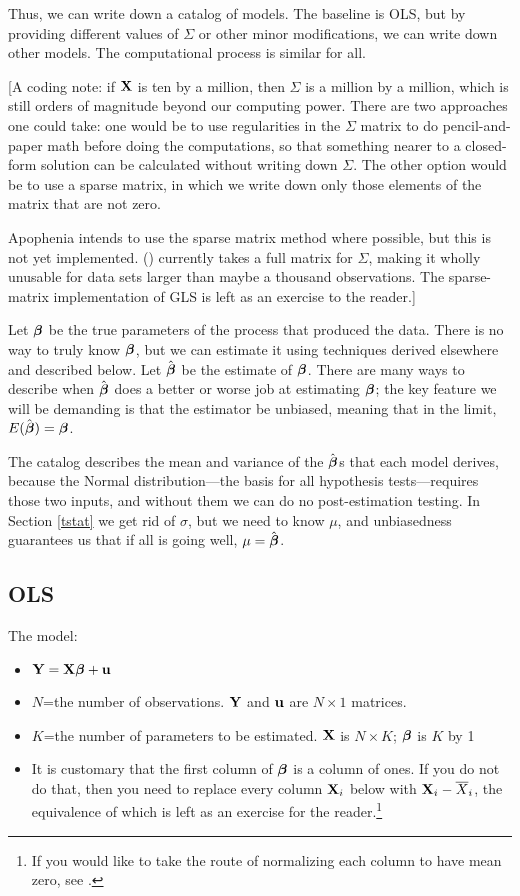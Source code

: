Thus, we can write down a catalog of models. The baseline is OLS, but by
providing different values of $\Sigma$ or other minor modifications, we
can write down other models. The computational process is similar
for all.

[A coding note: if ${\bf X}$ is ten by a million, then $\Sigma$ is a million
by a million, which is still orders of magnitude beyond our computing
power. There are two approaches one could take: one would be to use
regularities in the $\Sigma$ matrix to do pencil-and-paper math before
doing the computations, so that something nearer to a closed-form
solution can be calculated without writing down $\Sigma$. The other
option would be to use a sparse matrix, in which
we write down only those elements of the matrix that are not zero. 

Apophenia intends to use the sparse matrix method where possible, but this is not yet
implemented. () currently takes a full matrix
for $\Sigma$, making it wholly unusable for data sets larger than maybe a
thousand observations. The sparse-matrix implementation of GLS is
left as an exercise to the reader.]

Let ${\mbox{\boldmath$\beta$}}$ be the true parameters of the process that produced the
data. There is no way to truly know ${\mbox{\boldmath$\beta$}}$, but we can estimate it
using techniques derived elsewhere and described below. Let 
$\hat{{\mbox{\boldmath$\beta$}}}$ be the estimate of ${\mbox{\boldmath$\beta$}}$.  There are many ways to
describe when $\hat{{\mbox{\boldmath$\beta$}}}$ does a better or worse job at estimating 
${\mbox{\boldmath$\beta$}}$; the key feature we will be demanding is that the estimator be
unbiased, meaning that in the limit, $E(\hat{{\mbox{\boldmath$\beta$}}}) = {\mbox{\boldmath$\beta$}}$.

The catalog describes the mean and variance of the $\hat{{\mbox{\boldmath$\beta$}}}$s that
each model derives, because the Normal distribution---the basis for all
hypothesis tests---requires those two inputs,
and without them we can do no post-estimation testing.  
In Section \ref{tstat} we get rid of $\sigma$, but we
need to know $\mu$, and unbiasedness guarantees us that if all is going
well, $\mu =\hat{{\mbox{\boldmath$\beta$}}}$.

\subsection{OLS}
The model: 
\begin{itemize}
\item ${\bf Y}={\bf X}{\mbox{\boldmath$\beta$}} + {\bf u}$
\item $N$=the number of observations. ${\bf Y}$ and ${\bf u}$ are $N \times 1$
matrices.
\item $K$=the number of parameters to be estimated. ${\bf X}$ is $N \times K$;
${\mbox{\boldmath$\beta$}}$ is $K$ by 1
\item It is customary that the first column of ${\mbox{\boldmath$\beta$}}$ is a column of
ones. If you do not do that, then you need to replace every column ${\bf X}_i$ below
with ${\bf X}_i-\overline X_i$, the equivalence of which is left as an exercise
for the reader.\footnote{If you would like to take the route of
normalizing each column to have mean zero, see
.}
\end{itemize}

